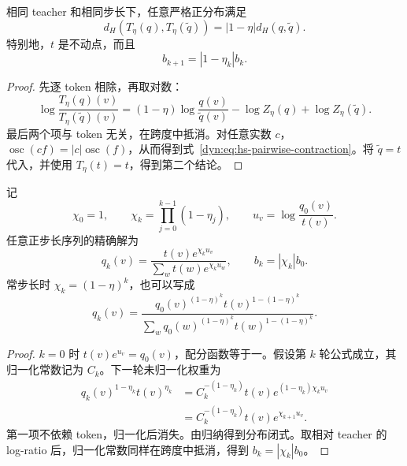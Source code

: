 \begin{theorem}
\label{dyn:thm:hs-pairwise-contraction}
相同 teacher 和相同步长下，任意严格正分布满足
\begin{equation}\label{dyn:eq:hs-pairwise-contraction}
 d_H(T_\eta(q),T_\eta(\widetilde q))
 =|1-\eta|d_H(q,\widetilde q).
\end{equation}
特别地，$t$ 是不动点，而且
\begin{equation*}
 b_{k+1}=|1-\eta_k|b_k.
\end{equation*}
\end{theorem}

\begin{proof}
先逐 token 相除，再取对数：
\begin{equation*}
 \log\frac{T_\eta(q)(v)}{T_\eta(\widetilde q)(v)}
 =(1-\eta)\log\frac{q(v)}{\widetilde q(v)}
 -\log Z_\eta(q)+\log Z_\eta(\widetilde q).
\end{equation*}
最后两个项与 token 无关，在跨度中抵消。对任意实数 $c$，$\operatorname{osc}(cf)=|c|\operatorname{osc}(f)$，从而得到式~\eqref{dyn:eq:hs-pairwise-contraction}。将 $\widetilde q=t$ 代入，并使用 $T_\eta(t)=t$，得到第二个结论。
\end{proof}

\begin{theorem}[常步长与变步长的精确解]
\label{dyn:thm:hard-sync}
记
\begin{equation*}
 \chi_0=1,\qquad \chi_k=\prod_{j=0}^{k-1}(1-\eta_j),
 \qquad u_v=\log\frac{q_0(v)}{t(v)}.
\end{equation*}
任意正步长序列的精确解为
\begin{equation}\label{dyn:eq:hard-closed}
 q_k(v)=\frac{t(v)e^{\chi_k u_v}}
 {\sum_wt(w)e^{\chi_k u_w}},
 \qquad b_k=|\chi_k|b_0.
\end{equation}
常步长时 $\chi_k=(1-\eta)^k$，也可以写成
\begin{equation*}
 q_k(v)=\frac{q_0(v)^{(1-\eta)^k}
 t(v)^{1-(1-\eta)^k}}
 {\sum_wq_0(w)^{(1-\eta)^k}
 t(w)^{1-(1-\eta)^k}}.
\end{equation*}
\end{theorem}

\begin{proof}
$k=0$ 时 $t(v)e^{u_v}=q_0(v)$，配分函数等于一。假设第 $k$ 轮公式成立，其归一化常数记为 $C_k$。下一轮未归一化权重为
\begin{align*}
 q_k(v)^{1-\eta_k}t(v)^{\eta_k}
 &=C_k^{-(1-\eta_k)}t(v)
       e^{(1-\eta_k)\chi_k u_v}\\
 &=C_k^{-(1-\eta_k)}t(v)e^{\chi_{k+1}u_v}.
\end{align*}
第一项不依赖 token，归一化后消失。由归纳得到分布闭式。取相对 teacher 的 log-ratio 后，归一化常数同样在跨度中抵消，得到 $b_k=|\chi_k|b_0$。
\end{proof}

